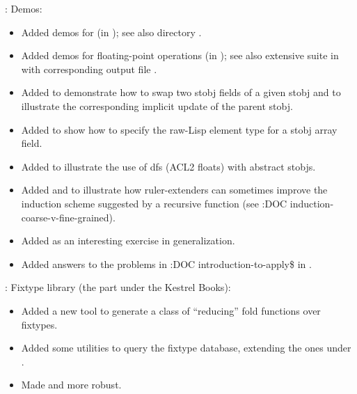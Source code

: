 \begin{frame}

\implibtitle

:
Demos:
\begin{itemize}
\item Added demos for  (in
      );
      see also directory .
\item Added demos for floating-point operations (in );
      see also extensive suite in 
      with corresponding output file .
\item Added  to demonstrate how
      to swap two stobj fields of a given stobj and to illustrate the
      corresponding implicit update of the parent stobj.
\item Added  to show how to specify
      the raw-Lisp  element type for a stobj array field.
\item Added  to illustrate
      the use of dfs (ACL2 floats) with abstract stobjs.
\item Added  and
       to illustrate how
      ruler-extenders can sometimes improve the induction scheme
      suggested by a recursive function (see :DOC
      induction-coarse-v-fine-grained).
\item Added  as an interesting exercise in
      generalization.
\item Added answers to the problems in :DOC introduction-to-apply\$ in
      .
\end{itemize}

\end{frame}


\begin{frame}

\implibtitle

:
Fixtype library (the part under the Kestrel Books):
\begin{itemize}
\item Added a new  tool
      to generate a class of ``reducing'' fold functions over fixtypes.
\item Added some utilities to query the fixtype database,
      extending the ones under .
\item Made  and  more robust.
\end{itemize}

\end{frame}

